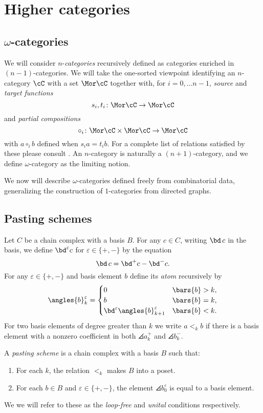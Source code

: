 
\appendix
\section{Higher categories}\label{s:categories}

\subsection{$\omega$-categories}

We will consider $n$-\textit{categories} recursively defined as categories enriched in $(n-1)$-categories.
We will take the one-sorted viewpoint identifying an $n$-category $\cC$ with a set $\Mor\cC$ together with, for $i = 0,\dots n-1$, \textit{source} and \textit{target functions}
\[
s_i, t_i \colon \Mor\cC \to \Mor\cC
\]
and \textit{partial compositions}
\[
\circ_i \colon \Mor\cC \times \Mor\cC \to \Mor\cC
\]
with $a \circ_i b$ defined when $s_i a = t_i b$.
For a complete list of relations satisfied by these please consult \cite[Definition 2.1]{steiner2004omega}.
An $n$-category is naturally a $(n+1)$-category, and we define $\omega$-category as the limiting notion.

We now will describe $\omega$-categories defined freely from combinatorial data, generalizing the construction of $1$-categories from directed graphs.

\subsection{Pasting schemes}

Let $C$ be a chain complex with a basis $B$.
For any $c \in C$, writing $\bd\, c$ in the basis, we define $\bd^\varepsilon c$ for $\varepsilon \in \{+,-\}$ by the equation
\[
\bd\, c = \bd^+c - \bd^-c.
\]
For any $\varepsilon \in \{+,-\}$ and basis element $b$ define its \textit{atom} recursively by
\[
\angles{b}^\varepsilon_k =
\begin{cases}
	0 & \bars{b} > k, \\
	b & \bars{b} = k, \\
	\bd^\varepsilon \angles{b}^\varepsilon_{k+1} & \bars{b} < k.
\end{cases}
\]
For two basis elements of degree greater than $k$ we write $a <_k b$ if there is a basis element with a nonzero coefficient in both $\angles{a}^+_k$ and $\angles{b}^-_k$.

\begin{definition*}
	A \textit{pasting scheme} is a chain complex with a basis $B$ such that:
	\begin{enumerate}
		\item\label{i:loop-free} For each $k$, the relation $<_k$ makes $B$ into a poset.
		\item\label{i:unital} For each $b \in B$ and $\varepsilon \in \{+,-\}$, the element $\angles{b}^\varepsilon_0$ is equal to a basis element.
	\end{enumerate}
	We we will refer to these as the \textit{loop-free} and \textit{unital} conditions respectively.
\end{definition*}

